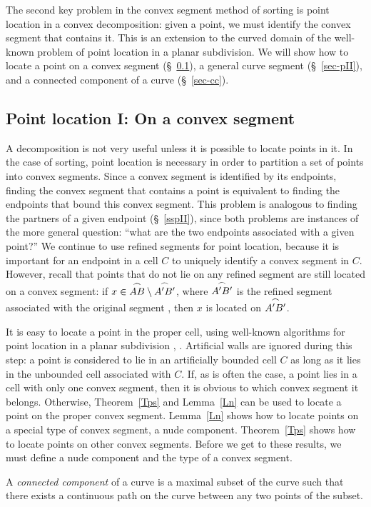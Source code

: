 The second key problem in the convex segment method of sorting is
point location in a convex decomposition: given a point, we must identify
the convex segment that contains it.
This is an extension to the curved domain of the well-known problem of point 
location in a planar subdivision. 
We will show how to locate a point on a convex segment (\S~\ref{sec-pI}), 
a general curve segment (\S~\ref{sec-pII}), and a connected component of a curve
(\S~\ref{sec-cc}).

\subsection{Point location I: On a convex segment}
\label{sec-pI}

A decomposition is not very useful unless it is possible to locate points in it. 
In the case of sorting, point location is necessary in order to partition a set of points
into convex segments.
Since a convex segment is identified by its endpoints, finding the convex 
segment that contains a point is equivalent to finding the endpoints that bound 
this convex segment.
This problem is analogous to finding the partners of a given
endpoint (\S~\ref{sspII}), since both problems are 
instances of the more general question: ``what are the two endpoints associated 
with a given point?''
We continue to use refined segments for point location, 
because it is important for 
an endpoint in a cell $C$ to uniquely identify a convex segment in $C$.
However, recall that points that do not lie on any refined segment are still located
on a convex segment: if $x \in \mbox{$\stackrel{\frown}{AB}$} \setminus \mbox{$\stackrel{\frown}{A'B'}$}$, where $\mbox{$\stackrel{\frown}{A'B'}$}$ 
is the refined segment associated with the original segment , 
then $x$ is located on $\mbox{$\stackrel{\frown}{A'B'}$}$.

It is easy to locate a point in the proper cell, using well-known algorithms 
for point location in a planar subdivision \cite{kirk}, \cite{PS}.
Artificial walls are ignored during this step: a point
is considered to lie in an artificially bounded cell $C$ as long as it lies
in the unbounded cell associated with $C$.
If, as is often the case, a point lies in a cell with only one convex segment, 
then it is obvious to which convex segment it belongs.
Otherwise, Theorem~\ref{Tps} and Lemma~\ref{Ln} can be used 
to locate a point on the proper convex segment.
Lemma~\ref{Ln} shows how to locate points on a special type of convex segment,
a nude component.
Theorem~\ref{Tps} shows how to locate points on other convex segments.
Before we get to these results, we must define a nude component and the type of
a convex segment.
%
\begin{definition}
A {\em connected component} of a curve is a maximal subset of the curve such that 
there exists a continuous path on the curve between any two points of the subset.
\end{definition}

